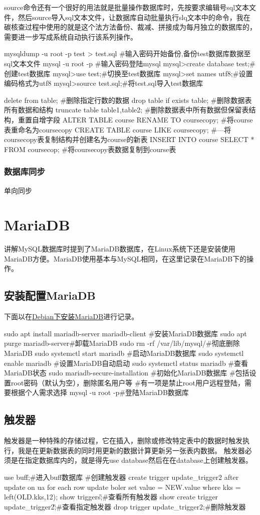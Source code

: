 source命令还有一个很好的用法就是批量操作数据库时，先按要求编辑号sql文本文件，然后source导入sql文本文件，让数据库自动批量执行slq文本中的命令，我在碳核查过程中使用的就是这个法方法备份、裁减、拼接成为每月独立的数据库的，需要进一步写成系统自动执行该系列操作。
\begin{shell}
mysqldump -u root -p test > test.sql
#输入密码开始备份,备份test数据库数据至sql文本文件
mysql -u root -p
#输入密码登陆mysql
mysql>create database test;#创建test数据库
mysql>use test;#切换至test数据库
mysql>set names utf8;#设置编码格式为utf8
mysql>source test.sql;#将test.sql导入test数据库
\end{shell}
\begin{shell}
delete from table;
#删除指定行数的数据
drop table if exists table;
#删除数据表所有数据和结构
truncate table table1,table2;
#删除数据表中所有数据但保留表结构，重置自增字段
ALTER TABLE course RENAME TO coursecopy;
#将course表重命名为coursecopy
CREATE TABLE course LIKE coursecopy;
#—将coursecopy表复制结构并创建名为course的新表
INSERT INTO course SELECT * FROM coursecop;
#将coursecopy表数据复制到course表
\end{shell}
\subsubsection{数据库同步}
单向同步
\section{MariaDB}
讲解MySQL数据库时提到了MariaDB数据库，在Linux系统下还是安装使用MariaDB方便。MariaDB使用基本与MySQL相同，在这里记录在MariaDB下的操作。
\subsection{安装配置MariaDB}
下面以在\href{https://blog.csdn.net/erliujian111/article/details/135732876?spm=1001.2014.3001.5506}{Debian下安装MariaDB}进行记录。
\begin{shell}
sudo apt install mariadb-server mariadb-client
#安装MariaDB数据库
sudo apt purge mariadb-server#卸载MariaDB
sudo rm -rf /var/lib/mysql/#彻底删除MariaDB
sudo systemctl start mariadb #启动MariaDB数据库
sudo systemctl enable mariadb #设置MariaDB自动启动
sudo systemctl status mariadb #查看MariaDB状态
sudo mariadb-secure-installation #初始化MariaDB数据库
#包括设置root密码（默认为空），删除匿名用户等
#有一项是禁止root用户远程登陆，需要根据个人需求选择
mysql -u root -p#登陆MariaDB数据库
\end{shell}
\subsection{触发器}
触发器是一种特殊的存储过程，它在插入，删除或修改特定表中的数据时触发执行，我是在更新数据表的同时用更新的数据计算更新另一张表内数据。
触发器必须是在指定数据库内的，就是得先use database然后在在database上创建触发器。
\begin{shell}
use buff;#进入buff数据库
#创建触发器
create trigger update_trigger2 after update on ua for each row update boler set value = NEW.value where kks = left(OLD.kks,12);
show triggers\G;#查看所有触发器
show create trigger update_trigger2\G;#查看指定触发器
drop trigger update_trigger2;#删除触发器
\end{shell}
